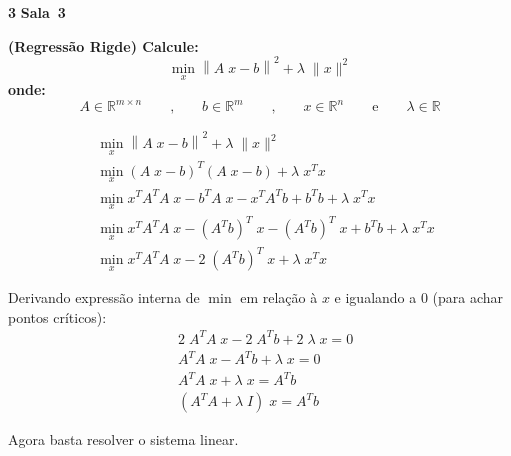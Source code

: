 \documentclass{article}
\newcommand{\R}{\mathbb{R}}
\newenvironment{question}
    {\medskip\bfseries\large}
    {\medskip}
\newcounter{exe-list}
\newenvironment{exe}[2][Sala]
    {\bigskip\noindent\par\ifthenelse{\equal{#1}{}}%
        {\textbf{\LARGE #2}}%
        {\textbf{\LARGE #1~#2}}%
    \medskip\noindent\par}
    {\bigskip}
\begin{document}
\begin{exe}{3}
    \begin{question}
        (Regressão Rigde) Calcule:
        \[
            \min_x \left\|
                A \; x - b
            \right\|^2
            + \lambda \; \|x\|^2
        \]
        onde:
        \[
            A \in \R^{m \times n}
            \qquad\text{,}\qquad
            b \in \R^m
            \qquad\text{,}\qquad
            x \in \R^n
            \qquad\text{e}\qquad
            \lambda \in \R
        \]
    \end{question}

    \begin{align*}
        &\min_x \left\| A \; x - b \right\|^2 + \lambda \; \|x\|^2 \\
        &\min_x (A \; x - b)^T (A \; x - b) + \lambda \; x^T x \\
        &\min_x x^T A^T A \; x - b^T A \; x
            - x^T A^T b + b^T b + \lambda \; x^T x \\
        &\min_x x^T A^T A \; x - (A^T b)^T \; x
            - (A^T b)^T \; x + b^T b + \lambda \; x^T x \\
        &\min_x x^T A^T A \; x - 2 \; (A^T b)^T \; x
            + \lambda \; x^T x
    \end{align*}

    Derivando expressão interna de \(\min\) em relação à \(x\)
    e igualando a \(0\) (para achar pontos críticos):
    \begin{align*}
        &2 \; A^T A \; x - 2 \; A^T b + 2 \; \lambda \; x = 0 \\
        &A^T A \; x - A^T b + \lambda \; x = 0 \\
        &A^T A \; x + \lambda \; x = A^T b \\
        &(A^T A + \lambda \; I) \; x = A^T b
    \end{align*}

    Agora basta resolver o sistema linear.
\end{exe}
\end{document}
